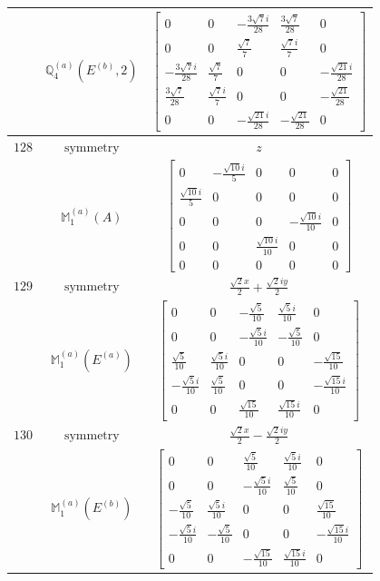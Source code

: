 \documentclass[fleqn,8pt,landscape]{jsarticle}
\begin{document}
\begin{longtable}{ccc}
$  $ & $ \mathbb{Q}_{4}^{(a)}(E^{(b)},2) $ & $ \begin{bmatrix} 0 & 0 & - \frac{3 \sqrt{7} i}{28} & \frac{3 \sqrt{7}}{28} & 0 \\ 0 & 0 & \frac{\sqrt{7}}{7} & \frac{\sqrt{7} i}{7} & 0 \\ - \frac{3 \sqrt{7} i}{28} & \frac{\sqrt{7}}{7} & 0 & 0 & - \frac{\sqrt{21} i}{28} \\ \frac{3 \sqrt{7}}{28} & \frac{\sqrt{7} i}{7} & 0 & 0 & - \frac{\sqrt{21}}{28} \\ 0 & 0 & - \frac{\sqrt{21} i}{28} & - \frac{\sqrt{21}}{28} & 0 \end{bmatrix} $ \\ \hline
$ 128 $ & $ \text{symmetry} $ & $ z $ \\
$  $ & $ \mathbb{M}_{1}^{(a)}(A) $ & $ \begin{bmatrix} 0 & - \frac{\sqrt{10} i}{5} & 0 & 0 & 0 \\ \frac{\sqrt{10} i}{5} & 0 & 0 & 0 & 0 \\ 0 & 0 & 0 & - \frac{\sqrt{10} i}{10} & 0 \\ 0 & 0 & \frac{\sqrt{10} i}{10} & 0 & 0 \\ 0 & 0 & 0 & 0 & 0 \end{bmatrix} $ \\ \hline
$ 129 $ & $ \text{symmetry} $ & $ \frac{\sqrt{2} x}{2} + \frac{\sqrt{2} i y}{2} $ \\
$  $ & $ \mathbb{M}_{1}^{(a)}(E^{(a)}) $ & $ \begin{bmatrix} 0 & 0 & - \frac{\sqrt{5}}{10} & \frac{\sqrt{5} i}{10} & 0 \\ 0 & 0 & - \frac{\sqrt{5} i}{10} & - \frac{\sqrt{5}}{10} & 0 \\ \frac{\sqrt{5}}{10} & \frac{\sqrt{5} i}{10} & 0 & 0 & - \frac{\sqrt{15}}{10} \\ - \frac{\sqrt{5} i}{10} & \frac{\sqrt{5}}{10} & 0 & 0 & - \frac{\sqrt{15} i}{10} \\ 0 & 0 & \frac{\sqrt{15}}{10} & \frac{\sqrt{15} i}{10} & 0 \end{bmatrix} $ \\ \hline
$ 130 $ & $ \text{symmetry} $ & $ \frac{\sqrt{2} x}{2} - \frac{\sqrt{2} i y}{2} $ \\
$  $ & $ \mathbb{M}_{1}^{(a)}(E^{(b)}) $ & $ \begin{bmatrix} 0 & 0 & \frac{\sqrt{5}}{10} & \frac{\sqrt{5} i}{10} & 0 \\ 0 & 0 & - \frac{\sqrt{5} i}{10} & \frac{\sqrt{5}}{10} & 0 \\ - \frac{\sqrt{5}}{10} & \frac{\sqrt{5} i}{10} & 0 & 0 & \frac{\sqrt{15}}{10} \\ - \frac{\sqrt{5} i}{10} & - \frac{\sqrt{5}}{10} & 0 & 0 & - \frac{\sqrt{15} i}{10} \\ 0 & 0 & - \frac{\sqrt{15}}{10} & \frac{\sqrt{15} i}{10} & 0 \end{bmatrix} $ \\ \hline

\end{longtable}
\end{document}
